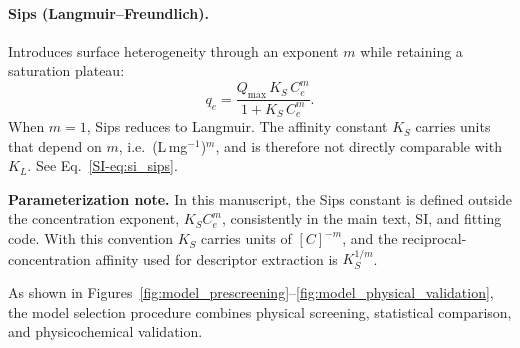 \documentclass[journal=jacsat,manuscript=article]{achemso}
\begin{document}
	\paragraph{Sips (Langmuir--Freundlich).}
	Introduces surface heterogeneity through an exponent $m$ while retaining a saturation plateau:
	\begin{equation}
		q_e = \frac{Q_{\max}\,K_S\, C_e^{m}}{1 + K_S\, C_e^{m}}.
		\label{eq:sips}
	\end{equation}
	When $m = 1$, Sips reduces to Langmuir. The affinity constant $K_S$ carries units that depend on $m$, i.e.\ (L\,mg$^{-1}$)$^{m}$, and is therefore not directly comparable with $K_L$.
	See Eq.~\eqref{SI-eq:si_sips}.

	\begin{mdframed}
	\noindent\textbf{Parameterization note.}
	In this manuscript, the Sips constant is defined outside the concentration exponent, \(K_S C_e^m\), consistently in the main text, SI, and fitting code. With this convention \(K_S\) carries units of \([C]^{-m}\), and the reciprocal-concentration affinity used for descriptor extraction is \(K_S^{1/m}\).
	\end{mdframed}
	
	As shown in Figures~\ref{fig:model_prescreening}--\ref{fig:model_physical_validation}, the model selection procedure combines physical screening, statistical comparison, and physicochemical validation.
	
	\newpage
\end{document}
